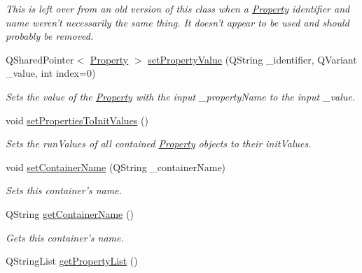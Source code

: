 \begin{DoxyCompactItemize}
\begin{DoxyCompactList}\small\item\em This is left over from an old version of this class when a \hyperlink{class_picto_1_1_property}{Property} identifier and name weren't necessarily the same thing. It doesn't appear to be used and should probably be removed. \end{DoxyCompactList}\item 
Q\-Shared\-Pointer$<$ \hyperlink{class_picto_1_1_property}{Property} $>$ \hyperlink{class_picto_1_1_property_container_a1abaeb184a705f0f671115289c1d3912}{set\-Property\-Value} (Q\-String \-\_\-identifier, Q\-Variant \-\_\-value, int index=0)
\begin{DoxyCompactList}\small\item\em Sets the value of the \hyperlink{class_picto_1_1_property}{Property} with the input \-\_\-property\-Name to the input \-\_\-value. \end{DoxyCompactList}\item 
void \hyperlink{class_picto_1_1_property_container_a834bdbd56b0c5c250008096ad09af4cd}{set\-Properties\-To\-Init\-Values} ()
\begin{DoxyCompactList}\small\item\em Sets the run\-Values of all contained \hyperlink{class_picto_1_1_property}{Property} objects to their init\-Values. \end{DoxyCompactList}\item 
void \hyperlink{class_picto_1_1_property_container_afb7a77c6c0803dc4db1566eecc54e045}{set\-Container\-Name} (Q\-String \-\_\-container\-Name)
\begin{DoxyCompactList}\small\item\em Sets this container's name. \end{DoxyCompactList}\item 
Q\-String \hyperlink{class_picto_1_1_property_container_a3a7fb67beedd6a604634fa566417fcf5}{get\-Container\-Name} ()
\begin{DoxyCompactList}\small\item\em Gets this container's name. \end{DoxyCompactList}\item 
\hypertarget{class_picto_1_1_property_container_a748d3fefd195a2fdc07acf4695bdcf04}{Q\-String\-List \hyperlink{class_picto_1_1_property_container_a748d3fefd195a2fdc07acf4695bdcf04}{get\-Property\-List} ()}\label{class_picto_1_1_property_container_a748d3fefd195a2fdc07acf4695bdcf04}


\end{DoxyCompactItemize}
